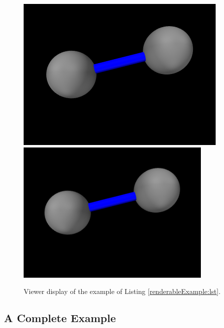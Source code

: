 %
\begin{figure}[t]
\begin{center}
\iflatexml
 \includegraphics[]{images/renderableExample}
\else
 \includegraphics[width=3.75in]{images/renderableExample}
\fi
\end{center}
\caption{Viewer display of the example of Listing \ref{renderableExample:lst}.}
\label{renderableExample:fig}
\end{figure}
%

\subsection{A Complete Example}

